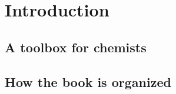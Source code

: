 \chapter{Introduction}

\section*{A toolbox for chemists}


\section*{How the book is organized}


\cleardoublepage